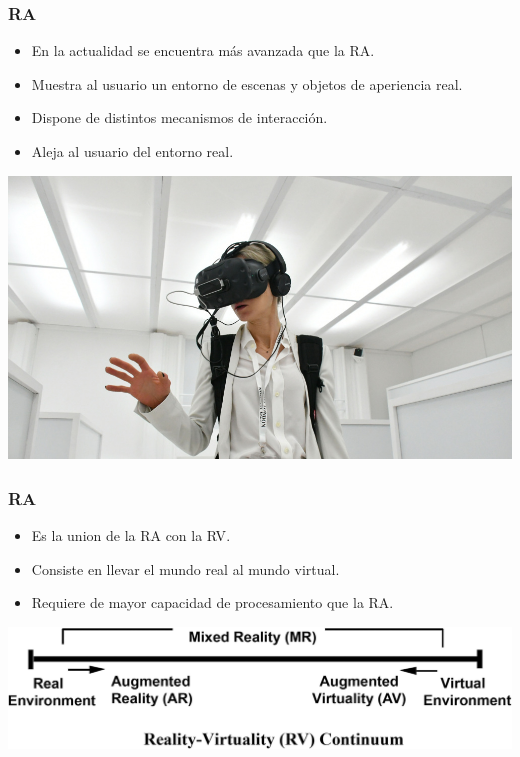 \begin{frame}
	\frametitle{RA}
			\begin{itemize}
				\item {En la actualidad se encuentra más avanzada que la RA.}
				\item {Muestra al usuario un entorno de escenas y objetos de aperiencia real.}
				\item {Dispone de distintos mecanismos de interacción.}
				\item {Aleja al usuario del entorno real.}
			\end{itemize}
		\endblock{}
			\begin{center}
				\includegraphics[width=0.50\linewidth]{Images/vr1}
			\end{center}
\end{frame}



\begin{frame}
	\frametitle{RA}
			\begin{itemize}
				\item {Es la union de la RA con la RV}.
				\item {Consiste en llevar el mundo real al mundo virtual.}
				\item {Requiere de mayor capacidad de procesamiento que la RA.}
			\end{itemize}
		\endblock{}
		\vfill 
			\begin{center}
				\includegraphics[width=0.8\linewidth]{Images/realidamixta}
			\end{center}
\end{frame}


